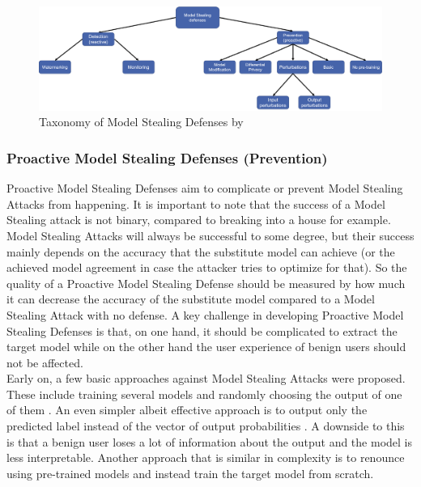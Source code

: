 \begin{figure} [ht]
    \centering
    \includegraphics[width=.9\linewidth]{images/MS_defenses_Taxonomy.png}
    \caption[Model Stealing Defenses Taxonomy]{Taxonomy of Model Stealing Defenses by \cite{oliynyk2022know}}
    \label{fig:ModelStealingDefenses:Taxonomy}
  \end{figure}

\subsubsection{Proactive Model Stealing Defenses (Prevention)}
\label{sec:ModelStealing:Defenses:Prevention}
Proactive Model Stealing Defenses aim to complicate or prevent Model Stealing Attacks from happening. It is important to note that the success of a Model Stealing attack is not binary,
compared to breaking into a house for example. Model Stealing Attacks will always be successful to some degree, but their success mainly depends on the accuracy that the substitute model
can achieve (or the achieved model agreement in case the attacker tries to optimize for that). So the quality of a Proactive Model Stealing Defense should be measured by how much it can 
decrease the accuracy of the substitute model compared to a Model Stealing Attack with no defense. A key challenge in developing Proactive Model Stealing Defenses is that, on one hand,
it should be complicated to extract the target model while on the other hand the user experience of benign users should not be affected. \\
Early on, a few basic approaches against Model Stealing Attacks were proposed. These include training several models and randomly choosing the output of one of them 
\cite{alabdulmohsin2014adding}. An even simpler albeit effective approach is to output only the predicted label instead of the vector of output probabilities \cite{tramer2016stealing}.
A downside to this is that a benign user loses a lot of information about the output and the model is less interpretable. Another approach that is similar in complexity is to renounce
using pre-trained models \cite{atli2020extraction} and instead train the target model from scratch. \\
